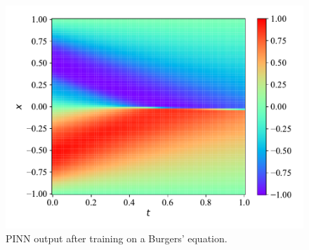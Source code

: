 \begin{figure}[H]
    \centering
    \includegraphics[width=1.0\linewidth]{Figures/InitialExperiments/burger.pdf}
    \caption{PINN output after training on a Burgers' equation.}
    \label{fig:burger}
\end{figure}

